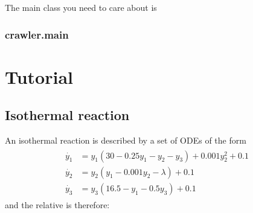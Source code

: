 \documentclass[letterpaper,10pt,english,openany,oneside]{sphinxmanual}
\begin{document}
The main class you need to care about is 


\subsection{crawler.main}
\label{\detokenize{plotting/plotting:crawler-main}}

\chapter{Tutorial}
\label{\detokenize{tutorial/index:tutorial}}\label{\detokenize{tutorial/index::doc}}

\section{Isothermal reaction}
\label{\detokenize{tutorial/isothermal_reaction:isothermal-reaction}}\label{\detokenize{tutorial/isothermal_reaction::doc}}
An isothermal reaction is described by a set of ODEs of the form 
\begin{equation*}
\begin{split}\begin{equation}
\begin{aligned}
\dot{y_1} &= y_{1}(30 - 0.25y_{1} -y_{2} -y_{3}) + 0.001y_{2}^{2} + 0.1 \\
\dot{y_{2}} &= y_{2}(y_{1} - 0.001y_{2} - \lambda) + 0.1 \\
\dot{y_{3}} &= y_{3}(16.5 - y_{1} -0.5y_{3}) + 0.1
\end{aligned}
\end{equation}\end{split}
\end{equation*}
and the relative  is therefore:
\end{document}
